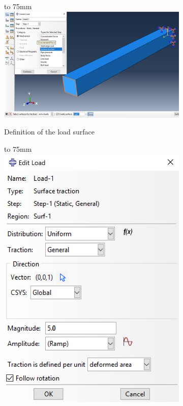 \documentclass[spanish,a4paper,12pt]{article}
\def\imagebox#1#2{\vtop to #1{\null\hbox{#2}\vfill}}
\begin{document}
\clearpage
\begin{figure}[h!tp]
\centering
\captionsetup[subfigure]{justification=centering,singlelinecheck=false}
  \begin{subfigure}[b]{0.74\textwidth}
  \hspace{0mm}
    \imagebox{75mm}{\includegraphics[scale=0.32]{capturas/load4.png}}
    \caption{Definition of the load surface\label{fig:load3a}}
  \end{subfigure}
  \begin{subfigure}[b]{0.25\textwidth}
  \hspace{0mm}
    \imagebox{75mm}{\includegraphics[scale=0.46]{capturas/load5.png}}

\end{subfigure}
\end{figure}
\end{document}
